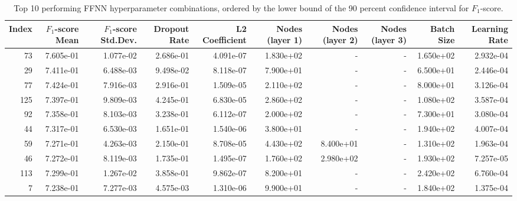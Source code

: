 \begin{table}
\caption{Top 10 performing FFNN hyperparameter combinations, ordered by the lower bound of the 90 percent confidence interval for $F_1$-score.}
\label{tab:05_best_ffnn_hpars}
\begin{tabular}{rrrrrrrrrr}
\toprule
Index & $F_1$-score Mean & $F_1$-score Std.Dev. & Dropout Rate & L2 Coefficient & Nodes (layer 1) & Nodes (layer 2) & Nodes (layer 3) & Batch Size & Learning Rate \\
\midrule
73 & 7.605e-01 & 1.077e-02 & 2.686e-01 & 4.091e-07 & 1.830e+02 & - & - & 1.650e+02 & 2.932e-04 \\
29 & 7.411e-01 & 6.488e-03 & 9.498e-02 & 8.118e-07 & 7.900e+01 & - & - & 6.500e+01 & 2.446e-04 \\
77 & 7.424e-01 & 7.916e-03 & 2.916e-01 & 1.509e-05 & 2.110e+02 & - & - & 8.000e+01 & 3.126e-04 \\
125 & 7.397e-01 & 9.809e-03 & 4.245e-01 & 6.830e-05 & 2.860e+02 & - & - & 1.080e+02 & 3.587e-04 \\
92 & 7.358e-01 & 8.103e-03 & 3.238e-01 & 6.112e-07 & 2.000e+02 & - & - & 7.300e+01 & 3.080e-04 \\
44 & 7.317e-01 & 6.530e-03 & 1.651e-01 & 1.540e-06 & 3.800e+01 & - & - & 1.940e+02 & 4.007e-04 \\
59 & 7.271e-01 & 4.263e-03 & 2.150e-01 & 8.708e-05 & 4.430e+02 & 8.400e+01 & - & 1.310e+02 & 1.963e-04 \\
46 & 7.272e-01 & 8.119e-03 & 1.735e-01 & 1.495e-07 & 1.760e+02 & 2.980e+02 & - & 1.930e+02 & 7.257e-05 \\
113 & 7.299e-01 & 1.267e-02 & 3.858e-01 & 9.862e-07 & 8.200e+01 & - & - & 2.420e+02 & 6.760e-04 \\
7 & 7.238e-01 & 7.277e-03 & 4.575e-03 & 1.310e-06 & 9.900e+01 & - & - & 1.840e+02 & 1.375e-04 \\
\bottomrule
\end{tabular}
\end{table}
